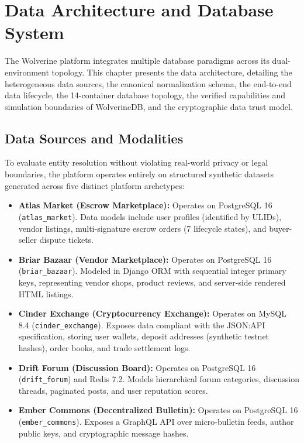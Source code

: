 \chapter{Data Architecture and Database System}
\label{ch:data-architecture}

The Wolverine platform integrates multiple database paradigms across its dual-environment topology. This chapter presents the data architecture, detailing the heterogeneous data sources, the canonical normalization schema, the end-to-end data lifecycle, the 14-container database topology, the verified capabilities and simulation boundaries of WolverineDB, and the cryptographic data trust model.

\section{Data Sources and Modalities}
\label{sec:data-sources}
To evaluate entity resolution without violating real-world privacy or legal boundaries, the platform operates entirely on structured synthetic datasets generated across five distinct platform archetypes:

\begin{itemize}
    \item \textbf{Atlas Market (Escrow Marketplace):} Operates on PostgreSQL 16 (\texttt{atlas\_market}). Data models include user profiles (identified by ULIDs), vendor listings, multi-signature escrow orders (7 lifecycle states), and buyer-seller dispute tickets.
    \item \textbf{Briar Bazaar (Vendor Marketplace):} Operates on PostgreSQL 16 (\texttt{briar\_bazaar}). Modeled in Django ORM with sequential integer primary keys, representing vendor shops, product reviews, and server-side rendered HTML listings.
    \item \textbf{Cinder Exchange (Cryptocurrency Exchange):} Operates on MySQL 8.4 (\texttt{cinder\_exchange}). Exposes data compliant with the JSON:API specification, storing user wallets, deposit addresses (synthetic testnet hashes), order books, and trade settlement logs.
    \item \textbf{Drift Forum (Discussion Board):} Operates on PostgreSQL 16 (\texttt{drift\_forum}) and Redis 7.2. Models hierarchical forum categories, discussion threads, paginated posts, and user reputation scores.
    \item \textbf{Ember Commons (Decentralized Bulletin):} Operates on PostgreSQL 16 (\texttt{ember\_commons}). Exposes a GraphQL API over micro-bulletin feeds, author public keys, and cryptographic message hashes.
\end{itemize}

